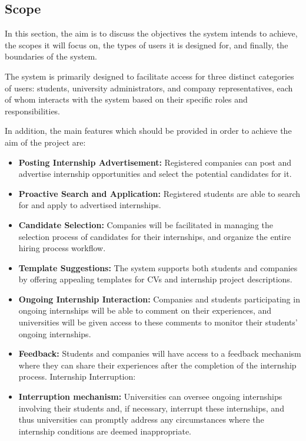 \documentclass[a4paper,12pt]{article}
\begin{document}
\subsection{Scope}
In this section, the aim is to discuss the objectives the system intends to achieve, the scopes it will focus on, the types of users it is designed for, and finally, the boundaries of the system.

The system is primarily designed to facilitate access for three distinct categories of users: students, university administrators, and company representatives, each of whom interacts with the system based on their specific roles and responsibilities.

In addition, the main features which should be provided in order to achieve the aim of the project are:
   \begin{itemize}
\item \textbf {Posting Internship Advertisement:} Registered companies can post and advertise internship opportunities and select the potential candidates for it.
\item \textbf {Proactive Search and Application:} Registered students are able to search for and apply to advertised internships.
 \item \textbf {Candidate Selection:} Companies will be facilitated in managing the selection process of candidates for their internships, and organize the entire hiring process workflow.
 \item \textbf {Template Suggestions:} The system supports both students and companies by offering appealing templates for CVs and internship project descriptions.
  \item \textbf {Ongoing Internship Interaction:} Companies and students participating in ongoing internships will be able to comment on their experiences, and universities will be given access to these comments to monitor their students' ongoing internships.
 \item \textbf {Feedback:} Students and companies will have access to a feedback mechanism where they can share their experiences after the completion of the internship process.
 Internship Interruption:
\item \textbf {Interruption mechanism:} Universities can oversee ongoing internships involving their students and, if necessary, interrupt these internships, and thus universities can promptly address any circumstances where the internship conditions are deemed inappropriate.
   \end{itemize}
\end{document}
